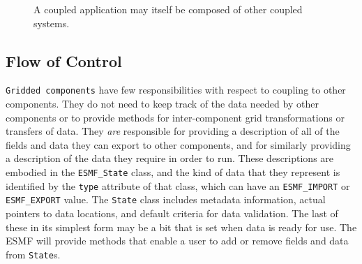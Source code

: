 \begin{figure}
\caption[{Scoping of Components in a Coupled Application}]{A coupled
application may itself be composed of other coupled systems.}
\label{fig:couplerscaling}
\end{figure}


\subsection{Flow of Control}
\label{sec:controlflow}
{\tt Gridded components} have few responsibilities with respect to coupling
to other components.  They do not need to keep track of the data needed
by other components or to provide methods for inter-component 
grid transformations or transfers of data.  They {\it are} responsible for 
providing a description of all of the fields and data they
can export to other components, and for similarly providing a description 
of the data they require in order to run.  These descriptions are
embodied in the {\tt ESMF\_State} class, and the kind of data that they 
represent is identified by the {\tt type} attribute of that class, which can
have an {\tt ESMF\_IMPORT} or {\tt ESMF\_EXPORT} value.  The {\tt State} class
includes metadata information, actual pointers to data 
locations, and default criteria for data validation.  The last of these in its
simplest form may be a bit that is set when data is ready for use.  The ESMF 
will provide methods that enable a user to add or remove fields and data from 
{\tt State}s.  

